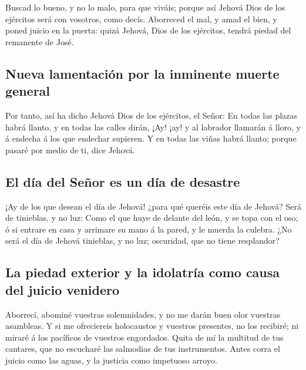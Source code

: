  Buscad lo bueno, y no lo malo, para que viváis; porque
así Jehová Dios de los ejércitos será con vosotros, como decís.
 Aborreced el mal, y amad el bien, y poned juicio en la
puerta: quizá Jehová, Dios de los ejércitos, tendrá piedad del remanente
de José.

\hypertarget{nueva-lamentaciuxf3n-por-la-inminente-muerte-general}{%
\subsection{Nueva lamentación por la inminente muerte
general}\label{nueva-lamentaciuxf3n-por-la-inminente-muerte-general}}

 Por tanto, así ha dicho Jehová Dios de los ejércitos, el
Señor: En todas las plazas habrá llanto, y en todas las calles dirán,
¡Ay! ¡ay! y al labrador llamarán á lloro, y á endecha á los que endechar
supieren.  Y en todas las viñas habrá llanto; porque
pasaré por medio de ti, dice Jehová.

\hypertarget{el-duxeda-del-seuxf1or-es-un-duxeda-de-desastre}{%
\subsection{El día del Señor es un día de
desastre}\label{el-duxeda-del-seuxf1or-es-un-duxeda-de-desastre}}

 ¡Ay de los que desean el día de Jehová! ¿para qué
queréis este día de Jehová? Será de tinieblas, y no luz: 
Como el que huye de delante del león, y se topa con el oso; ó si entrare
en casa y arrimare su mano á la pared, y le muerda la culebra.
 ¿No será el día de Jehová tinieblas, y no luz;
oscuridad, que no tiene resplandor?

\hypertarget{la-piedad-exterior-y-la-idolatruxeda-como-causa-del-juicio-venidero}{%
\subsection{La piedad exterior y la idolatría como causa del juicio
venidero}\label{la-piedad-exterior-y-la-idolatruxeda-como-causa-del-juicio-venidero}}

 Aborrecí, abominé vuestras solemnidades, y no me darán
buen olor vuestras asambleas.  Y si me ofreciereis
holocaustos y vuestros presentes, no los recibiré; ni miraré á los
pacíficos de vuestros engordados.  Quita de mí la
multitud de tus cantares, que no escucharé las salmodias de tus
instrumentos.  Antes corra el juicio como las aguas, y la
justicia como impetuoso arroyo.

